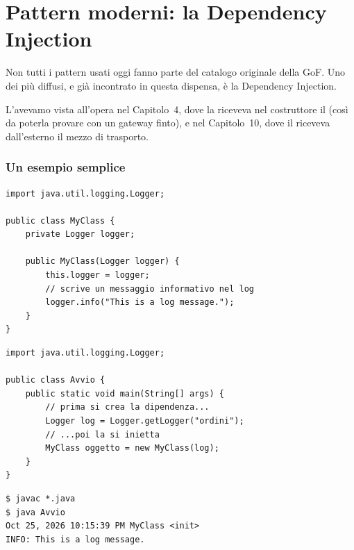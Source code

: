 \section{Pattern moderni: la Dependency Injection}

Non tutti i pattern usati oggi fanno parte del catalogo originale della GoF. Uno dei più diffusi, e già incontrato in questa
dispensa, è la Dependency Injection.


L'avevamo vista all'opera nel Capitolo~4, dove la  riceveva nel costruttore il  (così da
poterla provare con un gateway finto), e nel Capitolo~10, dove il  riceveva dall'esterno il mezzo di
trasporto.

\subsubsection*{Un esempio semplice}

\noindent\begin{minipage}[t]{0.49\textwidth}
\begin{lstlisting}[style=java, name=MyClass.java]
import java.util.logging.Logger;

public class MyClass {
    private Logger logger;

    public MyClass(Logger logger) {
        this.logger = logger;
        // scrive un messaggio informativo nel log
        logger.info("This is a log message.");
    }
}
\end{lstlisting}
\end{minipage}\hfill
\begin{minipage}[t]{0.49\textwidth}
\begin{lstlisting}[style=java, name=Avvio.java]
import java.util.logging.Logger;

public class Avvio {
    public static void main(String[] args) {
        // prima si crea la dipendenza...
        Logger log = Logger.getLogger("ordini");
        // ...poi la si inietta
        MyClass oggetto = new MyClass(log);
    }
}
\end{lstlisting}
\begin{lstlisting}[style=shell, name=Terminale]
$ javac *.java
$ java Avvio
Oct 25, 2026 10:15:39 PM MyClass <init>
INFO: This is a log message.
\end{lstlisting}
\end{minipage}


